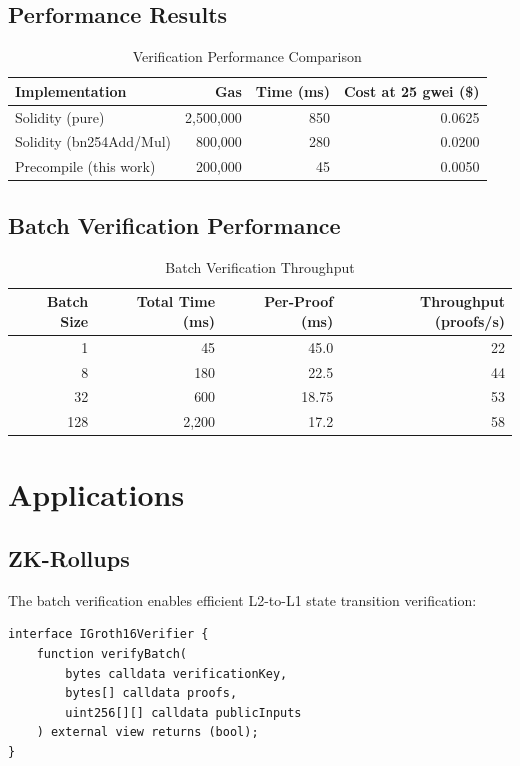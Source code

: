 \documentclass[11pt,a4paper]{article}
\theoremstyle{definition}
\begin{document}
\subsection{Performance Results}

\begin{table}[h]
\centering
\caption{Verification Performance Comparison}
\begin{tabular}{lrrr}
\toprule
Implementation & Gas & Time (ms) & Cost at 25 gwei (\$) \\
\midrule
Solidity (pure) & 2,500,000 & 850 & 0.0625 \\
Solidity (bn254Add/Mul) & 800,000 & 280 & 0.0200 \\
Precompile (this work) & 200,000 & 45 & 0.0050 \\
\bottomrule
\end{tabular}
\end{table}

\subsection{Batch Verification Performance}

\begin{table}[h]
\centering
\caption{Batch Verification Throughput}
\begin{tabular}{rrrr}
\toprule
Batch Size & Total Time (ms) & Per-Proof (ms) & Throughput (proofs/s) \\
\midrule
1 & 45 & 45.0 & 22 \\
8 & 180 & 22.5 & 44 \\
32 & 600 & 18.75 & 53 \\
128 & 2,200 & 17.2 & 58 \\
\bottomrule
\end{tabular}
\end{table}

\section{Applications}

\subsection{ZK-Rollups}

The batch verification enables efficient L2-to-L1 state transition verification:

\begin{lstlisting}[language=Solidity, caption={Rollup Verifier Interface}]
interface IGroth16Verifier {
    function verifyBatch(
        bytes calldata verificationKey,
        bytes[] calldata proofs,
        uint256[][] calldata publicInputs
    ) external view returns (bool);
}
\end{lstlisting}
\end{document}
